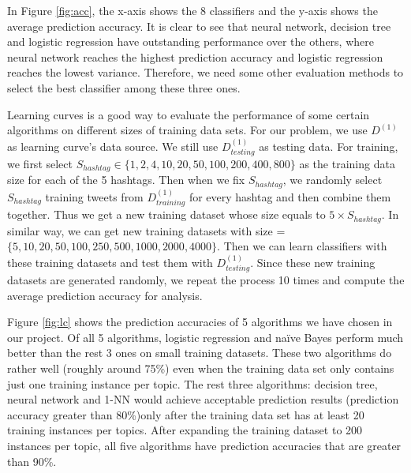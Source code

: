 \documentclass[letterpaper,11pt,twocolumn]{article}
\begin{document}
\begin{figure*}[!htb]
\centering
{}
\caption{Average Prediction Accuracies of 8 Algorithms}
\label{fig:acc}
\end{figure*}

In Figure \ref{fig:acc}, the x-axis shows the 8 classifiers and the y-axis shows the average prediction accuracy. It is clear to see that neural network, decision tree and logistic regression have outstanding performance over the others, where neural network reaches the highest prediction accuracy and logistic regression reaches the lowest variance. Therefore, we need some other evaluation methods to select the best classifier among these three ones.

Learning curves is a good way to evaluate the performance of some certain algorithms on different sizes of training data sets. For our problem, we use $D^{(1)}$ as learning curve's data source. We still use $D_{testing}^{(1)}$ as testing data. For training, we first select $S_{hashtag} \in \{1, 2, 4, 10, 20, 50, 100, 200, 400, 800\}$ as the training data size for each of the 5 hashtags. Then when we fix $S_{hashtag}$, we randomly select $S_{hashtag}$ training tweets from $D_{training}^{(1)}$ for every hashtag and then combine them together. Thus we get a new training dataset whose size equals to $5 \times S_{hashtag}$. In similar way, we can get new training datasets with size = $\{5, 10, 20, 50, 100, 250, 500, 1000, 2000, 4000\}$. Then we can learn classifiers with these training datasets and test them with $D_{testing}^{(1)}$. Since these new training datasets are generated randomly, we repeat the process 10 times and compute the average prediction accuracy for analysis.

\begin{figure*}[!htb]
\centering
{}
\caption{Learning Curve for 5 Different Algorithms}
\label{fig:lc}
\end{figure*}

Figure \ref{fig:lc} shows the prediction accuracies of 5 algorithms we have chosen in our project. Of all 5 algorithms, logistic regression and na{\"i}ve Bayes perform much better than the rest 3 ones on small training datasets. These two algorithms do rather well (roughly around 75\%) even when the training data set only contains just one training instance per topic. The rest three algorithms: decision tree, neural network and 1-NN would achieve acceptable prediction results (prediction accuracy greater than 80\%)only after the training data set has at least 20 training instances per topics. After expanding the training dataset to 200 instances per topic, all five algorithms have prediction accuracies that are greater than 90\%. 
\end{document}
